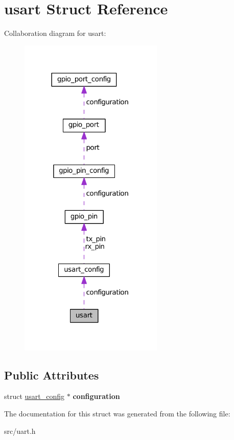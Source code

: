 \hypertarget{structusart}{}\section{usart Struct Reference}
\label{structusart}


Collaboration diagram for usart\+:\nopagebreak
\begin{figure}[H]
\begin{center}
\leavevmode
\includegraphics[width=194pt]{structusart__coll__graph}
\end{center}
\end{figure}
\subsection*{Public Attributes}
\begin{DoxyCompactItemize}
\item 
\hypertarget{structusart_a42f49f07a75c1ec44a8a1e04e08a760c}{}struct \hyperlink{structusart__config}{usart\+\_\+config} $\ast$ {\bfseries configuration}\label{structusart_a42f49f07a75c1ec44a8a1e04e08a760c}

\end{DoxyCompactItemize}


The documentation for this struct was generated from the following file\+:\begin{DoxyCompactItemize}
\item 
src/uart.\+h\end{DoxyCompactItemize}

